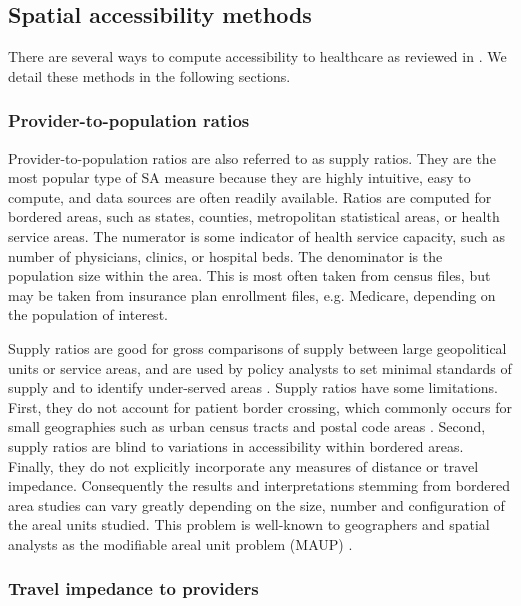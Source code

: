 \subsection{Spatial accessibility methods}

There are several ways to compute accessibility to healthcare as reviewed in \cite{guagliardo_spatial_2004}. We detail these methods in the following sections.

\subsubsection*{Provider-to-population ratios}


Provider-to-population ratios are also referred to as supply ratios. They are the most popular type of SA measure because they are highly intuitive, easy to compute, and data sources are often readily available. Ratios are computed for bordered areas, such as states, counties, metropolitan statistical areas, or health service areas. The numerator is some indicator of health service capacity, such as number of physicians, clinics, or hospital beds. The denominator is the population size within the area. This is most often taken from census files, but may be taken from insurance plan enrollment files, e.g. Medicare, depending on the population of interest.

Supply ratios are good for gross comparisons of supply between large geopolitical units or service areas, and are used by policy analysts to set minimal standards of supply and to identify under-served areas \cite{schonfeld_numbers_1972,council_on_graduate_medical_education_physician_1998,connor_competition_1995}. Supply ratios have some limitations. First, they do not account for patient border crossing, which commonly occurs for small geographies such as urban census tracts and postal code areas \cite{connor_measuring_1994,basu_border-crossing_1996,basu_medicare_1995,holahan_border_1993}. Second, supply ratios are blind to variations in accessibility within bordered areas. Finally, they do not explicitly incorporate any measures of distance or travel impedance. Consequently the results and interpretations stemming from bordered area studies can vary greatly depending on the size, number and configuration of the areal units studied. This problem is well-known to geographers and spatial analysts as the modifiable areal unit problem (MAUP) \cite{openshaw_modifiable_1983}.

\subsubsection*{Travel impedance to providers}


